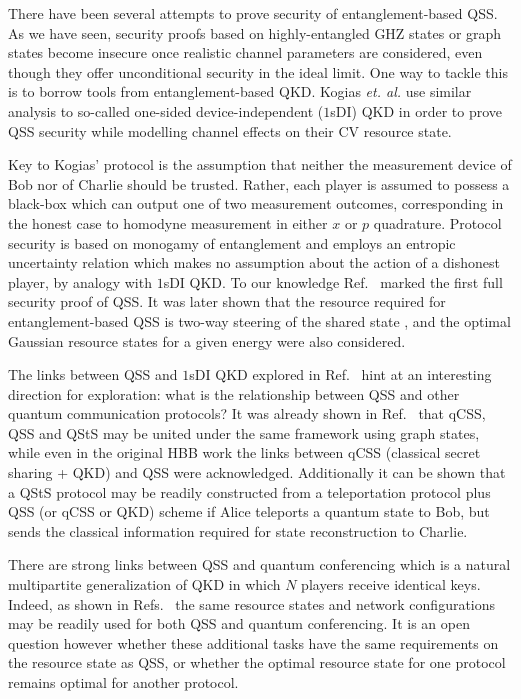 There have been several attempts to prove security of entanglement-based QSS. As we have seen, security proofs based on highly-entangled GHZ states or graph states become insecure once realistic channel parameters are considered, even though they offer unconditional security in the ideal limit. One way to tackle this is to borrow tools from entanglement-based QKD. Kogias \emph{et. al.} use similar analysis to so-called one-sided device-independent ($1$sDI) QKD \cite{Walk2016, Armstrong2015} in order to prove QSS security while modelling channel effects on their CV resource state.

Key to Kogias' protocol is the assumption that neither the measurement device of Bob nor of Charlie should be trusted. Rather, each player is assumed to possess a black-box which can output one of two measurement outcomes, corresponding in the honest case to homodyne measurement in either $x$ or $p$ quadrature. Protocol security is based on monogamy of entanglement and employs an entropic uncertainty relation which makes no assumption about the action of a dishonest player, by analogy with $1$sDI QKD. To our knowledge Ref.~\cite{Kogias2017} marked the first full security proof of QSS. It was later shown that the resource required for entanglement-based QSS is two-way steering of the shared state \cite{Xiang2017, Xiang2018}, and the optimal Gaussian resource states for a given energy were also considered. 

The links between QSS and $1$sDI QKD explored in Ref.~\cite{Kogias2017} hint at an interesting direction for exploration: what is the relationship between QSS and other quantum communication protocols? It was already shown in Ref.~\cite{Markham2008a} that qCSS, QSS and QStS may be united under the same framework using graph states, while even in the original HBB work \cite{Hillery1999} the links between qCSS (classical secret sharing + QKD) and QSS were acknowledged. Additionally it can be shown \cite{Hillery1999} that a QStS protocol may be readily constructed from a teleportation protocol plus QSS (or qCSS or QKD) scheme if Alice teleports a quantum state to Bob, but sends the classical information required for state reconstruction to Charlie.

There are strong links between QSS and quantum conferencing \cite{Wu2016, Ottaviani2017b} which is a natural multipartite generalization of QKD in which $N$ players receive identical keys. Indeed, as shown in Refs.~\cite{Wu2016, Ottaviani2017b} the same resource states and network configurations may be readily used for both QSS and quantum conferencing. It is an open question however whether these additional tasks have the same requirements \cite{Kogias2017, Xiang2017} on the resource state as QSS, or whether the optimal resource state for one protocol remains optimal for another protocol. 


